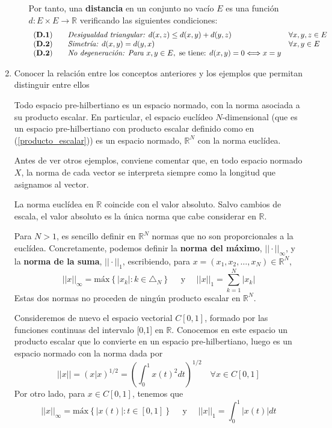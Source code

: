\documentclass[a4paper, 12pt]{article}
\begin{document}
\begin{enumerate}[label=\textbf{\arabic*}.]
\begin{enumerate}[label=\textit{\alph*})]
Por tanto, una \textbf{distancia} en un conjunto no vacío \(E\) es una función \(d: E \times E \rightarrow \mathbb{R}\) verificando las siguientes condiciones:
\[
\begin{array}{lll}
\text{(\textbf{D.1})} \quad & \textit{Desigualdad triangular: }d(x,z) \leq d(x,y) + d(y,z)  & \forall x,y,z \in E \\
\text{(\textbf{D.2})} \quad & \textit{Simetría: } d(x,y) = d(y,x) & \forall x,y \in E \\
\text{(\textbf{D.2})} \quad & \textit{No degeneración: Para } x,y \in E, \text{ se tiene: } d(x,y) = 0 \Longleftrightarrow x = y
\end{array}
\]
	\end{enumerate}
	
\newpage

\item Conocer la relación entre los conceptos anteriores y los ejemplos que permitan distinguir entre ellos

Todo espacio pre-hilbertiano es un espacio normado, con la norma asociada a su producto escalar. En particular, el espacio euclídeo \(N\)-dimensional (que es un espacio pre-hilbertiano con producto escalar definido como en (\ref{producto_escalar})) es un espacio normado, \(\mathbb{R}^N\) con la norma euclídea.

Antes de ver otros ejemplos, conviene comentar que, en todo espacio normado \(X\), la norma de cada vector se interpreta siempre como la longitud que asignamos al vector. 

La norma euclídea en \(\mathbb{R}\) coincide con el valor absoluto. Salvo cambios de escala, el valor absoluto es la única norma que cabe considerar en \(\mathbb{R}\). 

Para \(N>1\), es sencillo definir en \(\mathbb{R}^N\) normas que no son proporcionales a la euclídea. Concretamente, podemos definir la \textbf{norma del máximo}, \(|| \cdot ||_{\infty}\), y la \textbf{norma de la suma}, \(|| \cdot ||_1\), escribiendo, para \(x=(x_1,x_2,\dotsc,x_N) \in \mathbb{R}^N\),
\begin{equation}
	||x||_{\infty} = \text{máx} \left\{ |x_k| : k \in \triangle _N \right \} \quad \text{ y } \quad ||x||_1 = \sum_{k=1}^{N} |x_k|
\end{equation}
Estas dos normas no proceden de ningún producto escalar en \(\mathbb{R}^N\).

Consideremos de nuevo el espacio vectorial \(C[0,1]\), formado por las funciones continuas del intervalo [0,1] en \(\mathbb{R}\). Conocemos en este espacio un producto escalar que lo convierte en un espacio pre-hilbertiano, luego es un espacio normado con la norma dada por
\[
	||x|| = (x|x)^{1/2} = \left( \int_{0}^{1} x(t)^2 dt \right)^{1/2} \quad \forall x \in C[0,1]
\]
Por otro lado, para \(x \in C[0,1]\), tenemos que
\begin{equation}
	||x||_{\infty} = \text{máx} \left\{ |x(t)| : t \in [0,1] \right\} \quad \text{ y } \quad ||x||_1 = \int_{0}^{1} |x(t)| dt
\end{equation}


\end{enumerate}
\end{document}
